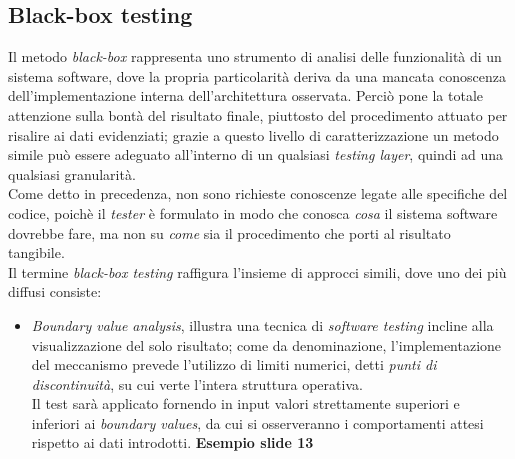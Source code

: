 \documentclass{article}
\begin{document}
\subsection*{Black-box testing}
\large
Il metodo \textit{black-box} rappresenta uno strumento di analisi delle funzionalità di un sistema software, dove la propria particolarità deriva da una mancata conoscenza dell'implementazione interna dell'architettura osservata. Perciò pone la totale attenzione sulla bontà del risultato finale, piuttosto del procedimento attuato per risalire ai dati evidenziati; grazie a questo livello di caratterizzazione un metodo simile può essere adeguato all'interno di un qualsiasi \textit{testing layer}, quindi ad una qualsiasi granularità.\vspace*{14pt}\\
Come detto in precedenza, non sono richieste conoscenze legate alle specifiche del codice, poichè il \textit{tester} è formulato in modo che conosca \textit{cosa} il sistema software dovrebbe fare, ma non su \textit{come} sia il procedimento che porti al risultato tangibile.\vspace*{14pt}\\
Il termine \textit{black-box testing} raffigura l'insieme di approcci simili, dove uno dei più diffusi consiste:
\begin{itemize}[label={-}]
    \itemsep0em
    \item \textit{Boundary value analysis}, illustra una tecnica di \textit{software testing} incline alla visualizzazione del solo risultato; come da denominazione, l'implementazione del meccanismo prevede l'utilizzo di limiti numerici, detti \textit{punti di discontinuità}, su cui verte l'intera struttura operativa.\vspace*{14pt}\\Il test sarà applicato fornendo in input valori strettamente superiori e inferiori ai \textit{boundary values}, da cui si osserveranno i comportamenti attesi rispetto ai dati introdotti. \textbf{Esempio slide 13}
\end{itemize}
\end{document}
